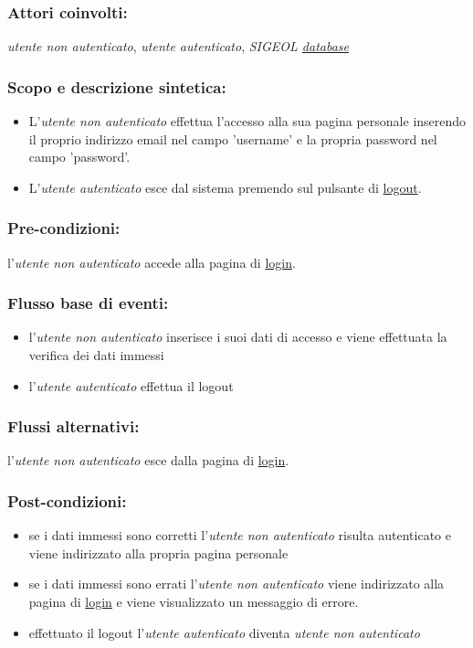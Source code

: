 \documentclass[11pt,a4paper]{article}
\begin{document}
\subsubsection*{Attori coinvolti:}
\textit{utente non autenticato}, \textit{utente autenticato}, \textit{SIGEOL \underline{database}}
\subsubsection*{Scopo e descrizione sintetica:}
\begin{itemize}
\item L'\textit{utente non autenticato} effettua l'accesso alla sua pagina personale inserendo il proprio indirizzo email nel campo 'username' e la propria password nel campo 'password'.
\item L'\textit{utente autenticato} esce dal sistema premendo sul pulsante di \underline{logout}.                      \end{itemize}
\subsubsection*{Pre-condizioni:}
l'\textit{utente non autenticato} accede alla pagina di \underline{login}.
\subsubsection*{Flusso base di eventi:}
\begin{itemize}
 \item l'\textit{utente non autenticato} inserisce i suoi dati di accesso e viene effettuata la verifica dei dati immessi
\item l'\textit{utente autenticato} effettua il logout 
\end{itemize}
\subsubsection*{Flussi alternativi:}
l'\textit{utente non autenticato} esce dalla pagina di \underline{login}.
\subsubsection*{Post-condizioni:}
\begin{itemize}
 \item se i dati immessi sono corretti l'\textit{utente non autenticato} risulta {autenticato} e viene indirizzato alla propria pagina personale
 \item se i dati immessi sono errati l'\textit{utente non autenticato} viene indirizzato alla pagina di \underline{login} e viene visualizzato un messaggio di errore. 
\item effettuato il logout l'\textit{utente autenticato} diventa \textit{utente non autenticato}
\end{itemize}
\end{document}
